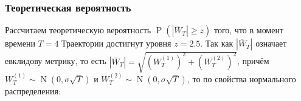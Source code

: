 \documentclass[14pt,a4paper]{scrartcl}
\begin{document}
\begin{figure}[H]
	\begin{minipage}[h]{1\linewidth}
		  \\
	\end{minipage}
	\begin{minipage}[h]{1\linewidth}
		  \\
	\end{minipage}
\end{figure}



\pagebreak

\subsubsection{Теоретическая вероятность}

Рассчитаем теоретическую вероятность $\operatorname{P}(|\overline{W}_T| \geq z)$ того, что в момент времени $T = 4$ Траектории достигнут уровня $z = 2.5$. Так как $|\overline{W}_T|$ означает евклидову метрику, то есть ${|\overline{W}_T| = \sqrt{(W^{(1)}_T)^2 + (W^{(2)}_T)^2}}$, причём  ${ W^{(1)}_T \sim \operatorname{N}(0, \sigma\sqrt{T}) }$ и ${ W^{(2)}_T \sim \operatorname{N}(0, \sigma\sqrt{T}) }$, то по свойства нормального распределения:
\end{document}
